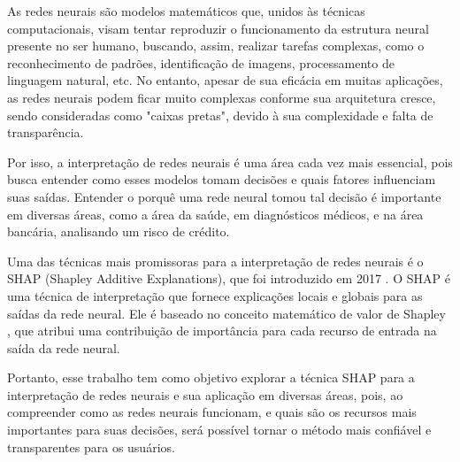 As redes neurais são modelos matemáticos que, unidos às técnicas computacionais, visam tentar reproduzir o funcionamento da estrutura neural presente no ser humano, buscando, assim, realizar tarefas complexas, como o reconhecimento de padrões, identificação de imagens, processamento de linguagem natural, etc. No entanto, apesar de sua eficácia em muitas aplicações, as redes neurais podem ficar muito complexas conforme sua arquitetura cresce, sendo consideradas como "caixas pretas", devido à sua complexidade e falta de transparência. 

Por isso, a interpretação de redes neurais é uma área cada vez mais essencial, pois busca entender como esses modelos tomam decisões e quais fatores influenciam suas saídas. Entender o porquê uma rede neural tomou tal decisão é importante em diversas áreas, como a área da saúde, em diagnósticos médicos, e na área bancária, analisando um risco de crédito.

Uma das técnicas mais promissoras para a interpretação de redes neurais é o SHAP (Shapley Additive Explanations), que foi introduzido em 2017 \citep{lundberg2017unified}. O SHAP é uma técnica de interpretação que fornece explicações locais e globais para as saídas da rede neural. Ele é baseado no conceito matemático de valor de Shapley \citep{shapley1953value}, que atribui uma contribuição de importância para cada recurso de entrada na saída da rede neural.

Portanto, esse trabalho tem como objetivo explorar a técnica SHAP para a interpretação de redes neurais e sua aplicação em diversas áreas, pois, ao compreender como as redes neurais funcionam, e quais são os recursos mais importantes para suas decisões, será possível tornar o método mais confiável e transparentes para os usuários. 


